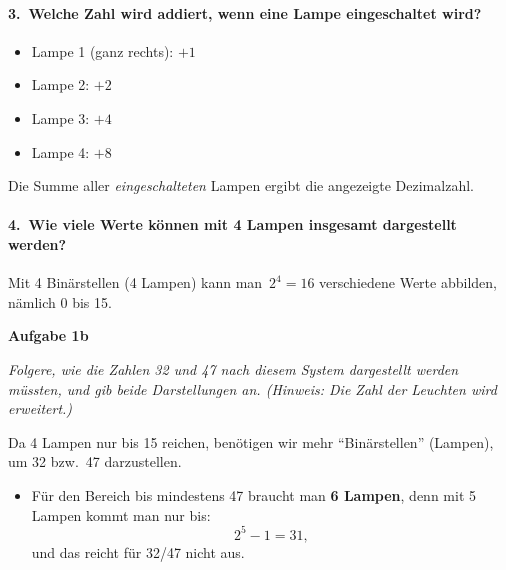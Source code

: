 \documentclass[a4paper,12pt]{article}
\begin{document}
                           \paragraph{3.\ Welche Zahl wird addiert, wenn eine Lampe eingeschaltet wird?}
                           \begin{itemize}
                            \item Lampe 1 (ganz rechts): \(+1\)
                             \item Lampe 2: \(+2\)
                              \item Lampe 3: \(+4\)
                               \item Lampe 4: \(+8\)
                               \end{itemize}
                               Die Summe aller \emph{eingeschalteten} Lampen ergibt die angezeigte Dezimalzahl.

                               \paragraph{4.\ Wie viele Werte können mit 4 Lampen insgesamt dargestellt werden?}
                               Mit 4 Binärstellen (4 Lampen) kann man \(\,2^4 = 16\) verschiedene Werte abbilden, nämlich 0 bis 15.

                               \bigskip

                               \textbf{Aufgabe 1b}

                               \emph{Folgere, wie die Zahlen 32 und 47 nach diesem System dargestellt werden müssten, und gib beide Darstellungen an. (Hinweis: Die Zahl der Leuchten wird erweitert.)}

                               Da 4 Lampen nur bis 15 reichen, benötigen wir mehr ``Binärstellen'' (Lampen), um 32 bzw.\ 47 darzustellen.

                               \begin{itemize}
                                \item Für den Bereich bis mindestens 47 braucht man \textbf{6 Lampen}, denn mit 5 Lampen kommt man nur bis:
                                   \[
                                        2^5 - 1 = 31,
                                           \]
                                              und das reicht für 32/47 nicht aus.
                                              \end{itemize}
\end{document}
